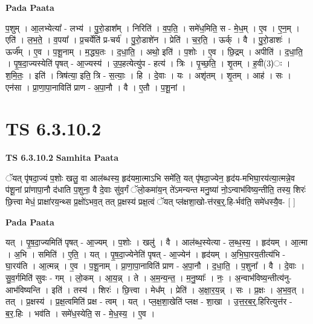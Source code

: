 \documentclass[17pt]{extarticle}
\begin{document}
\textbf{Pada Paata} \newline

प॒शुम् । आ॒लभ्येत्या᳚ - लभ्य॑ । पु॒रो॒डाश᳚म् । निरिति॑ । व॒प॒ति॒ । समे॑ध॒मिति॒ स - मे॒ध॒म् । ए॒व । ए॒न॒म् । एति॑ । ल॒भ॒ते॒ । व॒पया᳚ । प्र॒चर्येति॑ प्र-चर्य॑ । पु॒रो॒डाशे॑न । प्रेति॑ । च॒र॒ति॒ । ऊर्क् । वै । पु॒रो॒डाशः॑ । ऊर्ज᳚म् । ए॒व । प॒शू॒नाम् । म॒द्ध्य॒तः । द॒धा॒ति॒ । अथो॒ इति॑ । प॒शोः । ए॒व । छि॒द्रम् । अपीति॑ । द॒धा॒ति॒ । पृ॒ष॒दा॒ज्यस्येति॑ पृषत् - आ॒ज्यस्य॑ । उ॒प॒हत्येत्यु॑प - हत्य॑ । त्रिः । पृ॒च्छ॒ति॒ । शृ॒तम् । ह॒वी(3)ः । श॒मि॒तः॒ । इति॑ । त्रिष॑त्या॒ इति॒ त्रि - स॒त्याः॒ । हि । दे॒वाः । यः । अशृ॑तम् । शृ॒तम् । आह॑ । सः । एन॑सा । प्रा॒णा॒पा॒नाविति॑ प्राण - अ॒पा॒नौ । वै । ए॒तौ । प॒शू॒नां ।  \newline





\section{ TS 6.3.10.2 }

\textbf{TS 6.3.10.2 } \newline
\textbf{Samhita Paata} \newline

ॅयत् पृ॑षदा॒ज्यं प॒शोः खलु॒ वा आल॑ब्धस्य॒ हृद॑यमा॒त्माऽभि समे॑ति॒ यत् पृ॑षदा॒ज्येन॒ हृद॑य-मभिघा॒रय॑त्या॒त्मन्ने॒व प॑शू॒नां प्रा॑णापा॒नौ द॑धाति प॒शुना॒ वै दे॒वाः सु॑व॒र्गं ॅलो॒कमा॑य॒न् ते॑ऽमन्यन्त मनु॒ष्या॑ नो॒ऽन्वाभ॑विष्य॒न्तीति॒ तस्य॒ शिरः॑ छि॒त्त्वा मेधं॒ प्राक्षा॑रय॒न्थ्स प्र॒क्षो॑ऽभव॒त् तत् प्र॒क्षस्य॑ प्रक्ष॒त्वं ॅयत् प्ल॑क्षशा॒खो-त्त॑रब॒र्॒.हि-र्भव॑ति॒ समे॑धस्यै॒व- [  ] \newline

\textbf{Pada Paata} \newline

यत् । पृ॒ष॒दा॒ज्यमिति॑ पृषत् - आ॒ज्यम् । प॒शोः । खलु॑ । वै । आल॑ब्ध॒स्येत्या - ल॒ब्ध॒स्य॒ । हृद॑यम् । आ॒त्मा । अ॒भि । समिति॑ । ए॒ति॒ । यत् । पृ॒ष॒दा॒ज्येनेति॑ पृषत् - आ॒ज्येन॑ । हृद॑यम् । अ॒भि॒घा॒रय॒तीत्य॑भि - घा॒रय॑ति । आ॒त्मन्न् । ए॒व । प॒शू॒नाम् । प्रा॒णा॒पा॒नाविति॑ प्राण - अ॒पा॒नौ । द॒धा॒ति॒ । प॒शुना᳚ । वै । दे॒वाः । सु॒व॒र्गमिति॑ सुवः - गम् । लो॒कम् । आ॒य॒न्न् । ते । अ॒म॒न्य॒न्त॒ । म॒नु॒ष्याः᳚ । नः॒ । अ॒न्वाभ॑विष्य॒न्तीत्य॑नु-आभ॑विष्यन्ति । इति॑ । तस्य॑ । शिरः॑ । छि॒त्त्वा । मेध᳚म् । प्रेति॑ । अ॒क्षा॒र॒य॒न्न् । सः । प्र॒क्षः । अ॒भ॒व॒त् । तत् । प्र॒क्षस्य॑ । प्र॒क्ष॒त्वमिति॑ प्रक्ष - त्वम् । यत् । प्ल॒क्ष॒शा॒खेति॑ प्लक्ष - शा॒खा । उ॒त्त॒र॒ब॒र्॒.हिरित्युत्त॑र - ब॒र॒.हिः । भव॑ति । समे॑ध॒स्येति॒ स - मे॒ध॒स्य॒ । ए॒व ।  \newline
\end{document}
